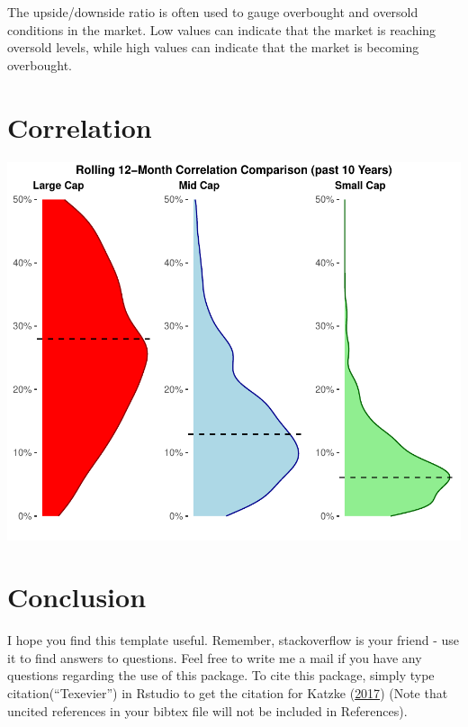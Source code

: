 \documentclass[11pt,preprint, authoryear]{elsarticle}
\let\origfigure\figure
\let\endorigfigure\endfigure
\renewenvironment{figure}[1][2] {
    \expandafter\origfigure\expandafter[H]
} {
    \endorigfigure
}
\numberwithin{equation}{section}
\numberwithin{figure}{section}
\numberwithin{table}{section}
\begin{document}
The upside/downside ratio is often used to gauge overbought and oversold
conditions in the market. Low values can indicate that the market is
reaching oversold levels, while high values can indicate that the market
is becoming overbought.

\hypertarget{correlation}{%
\section{\texorpdfstring{Correlation
\label{Correlation}}{Correlation }}\label{correlation}}

\begin{figure}[H]

{\centering \includegraphics{Volatility-of-Shares_files/figure-latex/Figure10-1} 

}

\caption{Rolling Correlation Comparison of the Indexes \label{Figure10}}\label{fig:Figure10}
\end{figure}

\hfill

\hypertarget{conclusion}{%
\section{\texorpdfstring{Conclusion
\label{Conclusion}}{Conclusion }}\label{conclusion}}

I hope you find this template useful. Remember, stackoverflow is your
friend - use it to find answers to questions. Feel free to write me a
mail if you have any questions regarding the use of this package. To
cite this package, simply type citation(``Texevier'') in Rstudio to get
the citation for Katzke (\protect\hyperlink{ref-Texevier}{2017}) (Note
that uncited references in your bibtex file will not be included in
References).
\end{document}
